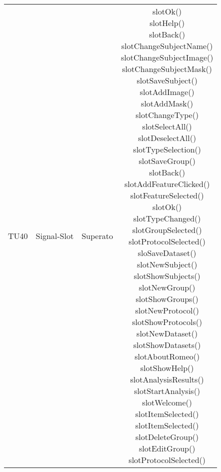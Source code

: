 \begin{center}
\begin{longtable}{|c|c|c|c|}
TU40 & \parbox[t]{\larghezza}{ Signal-Slot } & Superato & \parbox[t]{\dimTipo} { slotOk() \\ slotHelp() \\ slotBack() \\ slotChangeSubjectName() \\ slotChangeSubjectImage() \\ slotChangeSubjectMask() \\ slotSaveSubject() \\ slotAddImage() \\ slotAddMask() \\ slotChangeType() \\ slotSelectAll() \\ slotDeselectAll() \\ slotTypeSelection() \\ slotSaveGroup() \\ slotBack() \\ slotAddFeatureClicked() \\ slotFeatureSelected() \\ slotOk() \\ slotTypeChanged() \\ slotGroupSelected() \\ slotProtocolSelected() \\ sloSaveDataset() \\ slotNewSubject() \\ slotShowSubjects() \\ slotNewGroup() \\ slotShowGroups() \\ slotNewProtocol() \\ slotShowProtocols() \\ slotNewDataset() \\ slotShowDatasets() \\ slotAboutRomeo() \\ slotShowHelp() \\ slotAnalysisResults() \\ slotStartAnalysis() \\ slotWelcome() \\ slotItemSelected() \\ slotItemSelected() \\ slotDeleteGroup() \\ slotEditGroup() \\ slotProtocolSelected() \\ }\\


\end{longtable}
\end{center}
